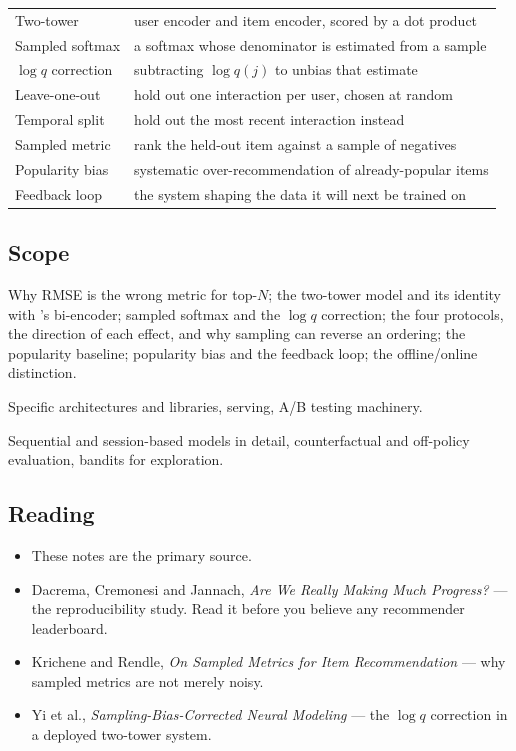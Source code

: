 \documentclass[11pt,a4paper]{article}
\begin{document}
\begin{center}
\small
\begin{tabular}{ll}
\toprule
Two-tower        & user encoder and item encoder, scored by a dot product \\
Sampled softmax  & a softmax whose denominator is estimated from a sample \\
$\log q$ correction & subtracting $\log q(j)$ to unbias that estimate \\
Leave-one-out    & hold out one interaction per user, chosen at random \\
Temporal split   & hold out the most recent interaction instead \\
Sampled metric   & rank the held-out item against a sample of negatives \\
Popularity bias  & systematic over-recommendation of already-popular items \\
Feedback loop    & the system shaping the data it will next be trained on \\
\bottomrule
\end{tabular}
\end{center}

\subsection{Scope}

 Why RMSE is the wrong metric for top-$N$; the two-tower
model and its identity with 's bi-encoder; sampled softmax and the
$\log q$ correction; the four protocols, the direction of each effect, and why
sampling can reverse an ordering; the popularity baseline; popularity bias and
the feedback loop; the offline/online distinction.

 Specific architectures and libraries,
serving, A/B testing machinery.

 Sequential and session-based models in detail,
counterfactual and off-policy evaluation, bandits for exploration.

\subsection{Reading}

\begin{itemize}[leftmargin=*,nosep]
  \item These notes are the primary source.
  \item Dacrema, Cremonesi and Jannach, \emph{Are We Really Making Much
        Progress?} --- the reproducibility study. Read it before you believe
        any recommender leaderboard.
  \item Krichene and Rendle, \emph{On Sampled Metrics for Item Recommendation}
        --- why sampled metrics are not merely noisy.
  \item Yi et al., \emph{Sampling-Bias-Corrected Neural Modeling} --- the
        $\log q$ correction in a deployed two-tower system.
\end{itemize}
\end{document}
